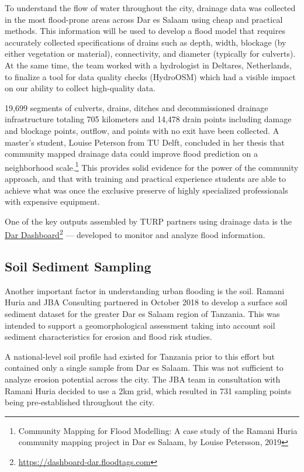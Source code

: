 \documentclass[a4paper,12pt,twoside]{article}
\begin{document}
\begin{multicols}{2}
To understand the flow of water throughout the city, drainage data was collected in the most flood-prone areas across Dar es Salaam using cheap and practical methods. This information will be used to develop a flood model that requires accurately collected specifications of drains such as depth, width, blockage (by either vegetation or material), connectivity, and diameter (typically for culverts). At the same time, the team worked with a hydrologist in Deltares, Netherlands, to finalize a tool for data quality checks (HydroOSM) which had a visible impact on our ability to collect high-quality data. 

19,699 segments of culverts, drains, ditches and decommissioned drainage infrastructure totaling 705 kilometers and 14,478 drain points including damage and blockage points, outflow, and points with no exit have been collected. A master’s student, Louise Peterson from TU Delft, concluded in her thesis that community mapped drainage data could improve flood prediction on a neighborhood scale.\footnote{ Community Mapping for Flood Modelling: A case study of the Ramani Huria community mapping project in Dar es Salaam, by Louise Petersson, 2019} This provides solid evidence for the power of the community approach, and that with training and practical experience students are able to achieve what was once the exclusive preserve of highly specialized professionals with expensive equipment. 

One of the key outputs assembled by TURP partners using drainage data is the  \href{https://www.hotosm.org/updates/piloting-tanzanias-first-patient-origin-tracking-system/}{Dar Dashboard}\footnote{\url{https://dashboard-dar.floodtags.com}} --- developed to monitor and analyze flood information.
\end{multicols}

\newpage
\subsection{Soil Sediment Sampling}

\begin{multicols}{2}
Another important factor in understanding urban flooding is the soil. Ramani Huria and JBA Consulting partnered in October 2018 to develop a surface soil sediment dataset for the greater Dar es Salaam region of Tanzania. This was intended to support a geomorphological assessment taking into account soil sediment characteristics for erosion and flood risk studies.

A national-level soil profile had existed for Tanzania prior to this effort but contained only a single sample from Dar es Salaam. This was not sufficient to analyze erosion potential across the city. The JBA team in consultation with Ramani Huria decided to use a 2km grid, which resulted in 731 sampling points being pre-established throughout the city.
\end{multicols}
\end{document}
